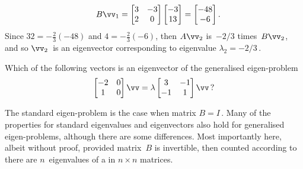 \begin{example}
\begin{solution}
\begin{itemize}
\begin{eqnarray*}
\\&&B\vv_1=\begin{bmatrix} 3&-3\\2&0 \end{bmatrix}\begin{bmatrix} -3\\13 \end{bmatrix}
=\begin{bmatrix} -48\\-6 \end{bmatrix}.
\end{eqnarray*}
Since \(32=-\tfrac23(-48)\) and \(4=-\tfrac23(-6)\), then \(A\vv_2\) is~\(-2/3\) times~\(B\vv_2\), and so \(\vv_2\)~is an eigenvector corresponding to eigenvalue \(\lambda_2=-2/3\)\,.
\end{itemize}
\end{solution}
\end{example}


\begin{activity}
Which of the following vectors is an eigenvector of the generalised eigen-problem
\begin{equation*}
\begin{bmatrix} -2&0\\1&0 \end{bmatrix}\vv=\lambda\begin{bmatrix} 3&-1\\-1&1 \end{bmatrix}\vv\,?
\end{equation*}
\end{activity}


The standard eigen-problem is the case when matrix \(B=I\)\,.
Many of the properties for standard eigenvalues and eigenvectors also hold for generalised eigen-problems, although there are some differences.
Most importantly here, albeit without proof, provided matrix~\(B\) is invertible, then counted according to  there are \(n\)~eigenvalues of a  in \(n\times n\) matrices.

